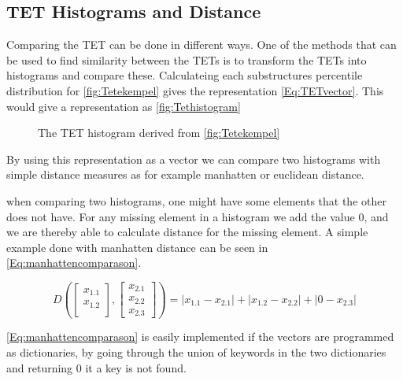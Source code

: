 \subsection{TET Histograms and Distance}
	Comparing the TET can be done in different ways. One of the methods that can be used to find similarity between the TETs is to transform the TETs into histograms and compare these\cite{JAEGER201330}. Calculateing each substructures percentile distribution for \autoref{fig:Tetekempel} gives the representation \autoref{Eq:TETvector}. This would give a representation as \autoref{fig:Tethistogram}
	
	\begin{figure}[H]
		\centering
		\begin{adjustbox}{width=0.5\textwidth}
			
		\end{adjustbox}
		\caption{The TET histogram derived from \autoref{fig:Tetekempel}}
		\label{fig:Tethistogram}
	\end{figure}
	
	By using this representation as a vector we can compare two histograms with simple distance measures as for example manhatten or euclidean distance.
	
	when comparing two histograms, one might have some elements that the other does not have. For any missing element in a histogram we add the value $0$, and we are thereby able to calculate distance for the missing element. A simple example done with manhatten distance can be seen in \autoref{Eq:manhattencomparason}\cite{singh2013k}.
	
	\begin{equation}\label{Eq:manhattencomparason}
	D(\begin{bmatrix}
	x_{1.1} \\
	x_{1.2} \\
	\end{bmatrix},
	\begin{bmatrix}
	x_{2.1} \\
	x_{2.2} \\
	x_{2.3}
	\end{bmatrix})= |x_{1.1} - x_{2.1}| + |x_{1.2} - x_{2.2}| + |0 - x_{2.3}|
	\end{equation}
	
	\autoref{Eq:manhattencomparason} is easily implemented if the vectors are programmed as dictionaries, by going through the union of keywords in the two dictionaries and returning 0 it a key is not found.
